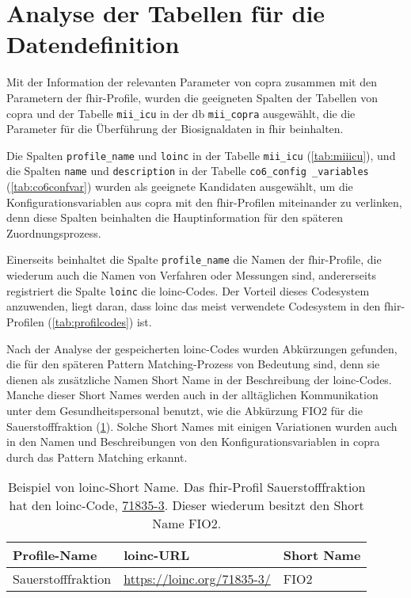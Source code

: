 \section{Analyse der Tabellen für die Datendefinition} \label{sec:analysiscolums}

Mit der Information der relevanten Parameter von \ac{copra} zusammen mit den Parametern der \ac{fhir}-Profile, wurden die geeigneten Spalten der Tabellen von \ac{copra} und der Tabelle \texttt{mii\_icu} in der \ac{db} \texttt{mii\_copra} ausgewählt, die die Parameter für die Überführung der Biosignaldaten in \ac{fhir} beinhalten.

Die Spalten \texttt{profile\_name} und \texttt{loinc} in der Tabelle \texttt{mii\_icu} (\ref{tab:miiicu}), und die Spalten \texttt{name} und \texttt{description} in der Tabelle \texttt{co6\_config \_variables} (\ref{tab:co6confvar}) wurden als geeignete Kandidaten ausgewählt, um die Konfigurationsvariablen aus \ac{copra} mit den \ac{fhir}-Profilen miteinander zu verlinken, denn diese Spalten beinhalten die Hauptinformation für den späteren Zuordnungsprozess.
 
 Einerseits beinhaltet die Spalte \texttt{profile\_name} die Namen der \ac{fhir}-Profile, die wiederum auch die Namen von Verfahren oder Messungen sind, andererseits registriert die Spalte \texttt{loinc} die \ac{loinc}-Codes. Der Vorteil dieses Codesystem anzuwenden, liegt daran, dass \ac{loinc} das meist verwendete Codesystem in den \ac{fhir}-Profilen (\ref{tab:profilcodes}) ist. 
 
 Nach der Analyse der gespeicherten \ac{loinc}-Codes wurden Abkürzungen gefunden, die für den späteren Pattern Matching-Prozess von Bedeutung sind, denn sie dienen als zusätzliche Namen \glqq Short Name\grqq{} in der Beschreibung der \ac{loinc}-Codes. Manche dieser \glqq Short Names\grqq{} werden auch in der alltäglichen Kommunikation unter dem Gesundheitspersonal benutzt, wie die Abkürzung FIO2 für die Sauerstofffraktion (\ref{tab:shortname}). Solche \glqq Short Names\grqq{} mit einigen Variationen wurden auch in den Namen und Beschreibungen von den Konfigurationsvariablen in \ac{copra} durch das Pattern Matching erkannt.

\begin{table}[ht]
	\centering 
	\caption[Beispiel von \acs{loinc}-\glqq Short Name\grqq{}]{Beispiel von \acs{loinc}-\glqq Short Name\grqq{}. Das \ac{fhir}-Profil \glqq Sauerstofffraktion\grqq{} hat den \ac{loinc}-Code, \href{https://loinc.org/71835-3/}{71835-3}. Dieser wiederum besitzt den \glqq Short Name\grqq{} FIO2.}
	\label{tab:shortname}
	\begin{tabular}{|p{4cm}|l|l|}
		\hline
		\bfseries Profile-Name & \bfseries \ac{loinc}-URL & \bfseries Short Name \\ \hline
		Sauerstofffraktion & \url{https://loinc.org/71835-3/} & 
		FIO2 \\ \hline 
	\end{tabular}
\end{table}

